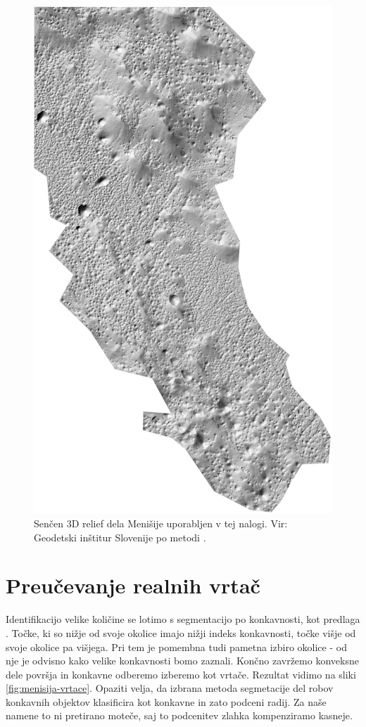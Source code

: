 \documentclass[a4paper, oneside, 12pt]{book}
\begin{document}
\begin{figure}[H]
  \begin{center}
    \includegraphics[width=12cm]{slike/menisija-relief}
  \end{center}
  \caption{Senčen 3D relief dela Menišije uporabljen v tej nalogi. Vir: Geodetski inštitur Slovenije \cite{LAK} po metodi \cite{Kobler20079}.}
  \label{fig:menisija-relief}
\end{figure}
\chapter{Preučevanje realnih vrtač}

Identifikacijo velike količine se lotimo s segmentacijo po konkavnosti, kot predlaga \cite{doctor13}. Točke, ki so nižje od svoje okolice imajo nižji indeks konkavnosti, točke višje od svoje okolice pa višjega. Pri tem je pomembna tudi pametna izbiro okolice - od nje je odvisno kako velike konkavnosti bomo zaznali. Končno zavržemo konveksne dele površja in konkavne odberemo izberemo kot vrtače. Rezultat vidimo na sliki \ref{fig:menisija-vrtace}. Opaziti velja, da izbrana metoda segmetacije del robov konkavnih objektov klasificira kot konkavne in zato podceni radij. Za naše namene to ni pretirano moteče, saj to podcenitev zlahka kompenziramo kasneje.
\end{document}
